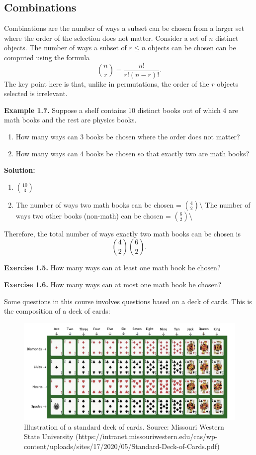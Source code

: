 \documentclass[
  12pt,
]{krantzNoCorner}
\begin{document}
\hypertarget{combinations}{%
\subsection{Combinations}\label{combinations}}

Combinations are the number of ways a subset can be chosen from a larger
set where the order of the selection does not matter. Consider a set of
\(n\) distinct objects. The number of ways a subset of \(r\leq n\) objects
can be chosen can be computed using the formula
\[{n\choose r} = \frac{n!}{r!(n-r)!}.\] The key point here is that,
unlike in permutations, the order of the \(r\) objects selected is
irrelevant.

\textbf{Example 1.7.} Suppose a shelf contains 10 distinct books out of which
4 are math books and the rest are physics books.

\begin{enumerate}
\def\labelenumi{\arabic{enumi}.}
\item
  How many ways can 3 books be chosen where the order does not matter?
\item
  How many ways can 4 books be chosen so that exactly two are math
  books?
\end{enumerate}

\textbf{Solution:}

\begin{enumerate}
\def\labelenumi{\arabic{enumi}.}
\item
  \(10\choose 3\)
\item
  The number of ways two math books can be chosen = \(4\choose 2\)\textbackslash{} The
  number of ways two other books (non-math) can be chosen =
  \(6\choose 2\)\textbackslash{}
\end{enumerate}

Therefore, the total number of ways exactly two math books can be chosen
is \[{4\choose 2}{6\choose 2}.\]

\textbf{Exercise 1.5.} How many ways can at least one math book be chosen?

\textbf{Exercise 1.6.} How many ways can at most one math book be chosen?

Some questions in this course involves questions based on a deck of
cards. This is the composition of a deck of cards:

\begin{figure}
\includegraphics[width=0.9\linewidth,height=0.4\textheight]{deckofcards} \caption{Illustration of a standard deck of cards. Source: Missouri Western State University (https://intranet.missouriwestern.edu/cas/wp-content/uploads/sites/17/2020/05/Standard-Deck-of-Cards.pdf)}\label{fig:ExCardDeck}
\end{figure}
\end{document}

